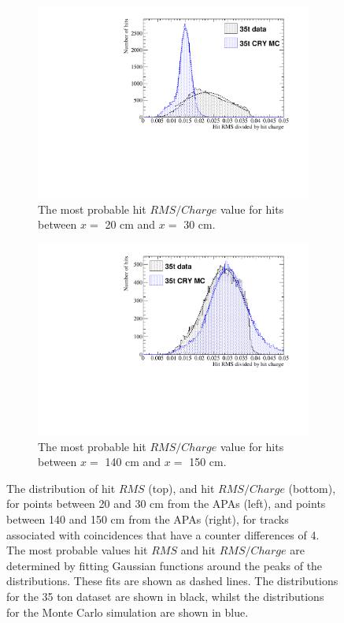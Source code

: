 \begin{figure}[h!]
\begin{subfigure}{0.48\textwidth}
    \includegraphics[width=\textwidth]{CombCan_2}
    \caption{The most probable hit $RMS/Charge$ value for hits between $x =$ 20 cm and $x =$ 30 cm.}
  \end{subfigure}%
  \hspace{0.03\textwidth}%
  \begin{subfigure}{0.48\textwidth}
    \centering
    \includegraphics[width=\textwidth]{CombCan_3}
    \caption{The most probable hit $RMS/Charge$ value for hits between $x =$ 140 cm and $x =$ 150 cm.}
    \label{fig:DiffMCHitFit_3}
  \end{subfigure}
  \caption[The most probable values of the $RMS$ and $RMS/Charge$ distributions for tracks with a counter difference of 4 in the 35 ton data and a low noise 35 ton detector]
          {The distribution of hit $RMS$ (top), and hit $RMS/Charge$ (bottom), for points between 20 and 30 cm from the APAs (left), and points between 140 and 150 cm from the APAs (right), for tracks associated with coincidences that have a counter differences of 4. The most probable values hit $RMS$ and hit $RMS/Charge$ are determined by fitting Gaussian functions around the peaks of the distributions. These fits are shown as dashed lines. The distributions for the 35 ton dataset are shown in black, whilst the distributions for the Monte Carlo simulation are shown in blue.}
          \label{fig:DiffMCHitFit}
\end{figure}

